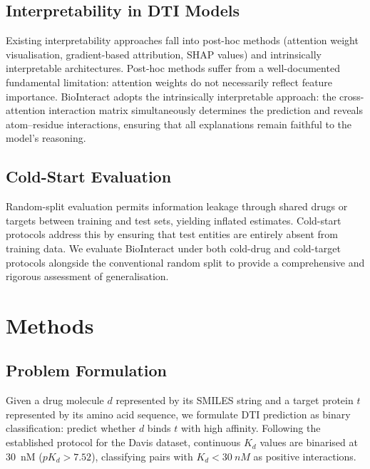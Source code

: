 \documentclass[fleqn,10pt]{wlscirep}
\begin{document}
\subsection{Interpretability in DTI Models}

Existing interpretability approaches fall into post-hoc methods (attention weight
visualisation, gradient-based attribution, SHAP
values\cite{jimenez2020drug}) and intrinsically interpretable architectures.
Post-hoc methods suffer from a well-documented fundamental limitation: attention
weights do not necessarily reflect feature importance.\cite{jain2019attention}
BioInteract adopts the intrinsically interpretable approach: the cross-attention
interaction matrix simultaneously determines the prediction and reveals
atom--residue interactions, ensuring that all explanations remain faithful to
the model's reasoning.

\subsection{Cold-Start Evaluation}

Random-split evaluation permits information leakage through shared drugs or
targets between training and test sets, yielding inflated
estimates.\cite{huang2021therapeutics}  Cold-start protocols address this by
ensuring that test entities are entirely absent from training data.  We evaluate
BioInteract under both cold-drug and cold-target protocols alongside the
conventional random split to provide a comprehensive and rigorous assessment of
generalisation.

\section{Methods}
\label{sec:methods}

\subsection{Problem Formulation}

Given a drug molecule $d$ represented by its SMILES string and a target protein
$t$ represented by its amino acid sequence, we formulate DTI prediction as
binary classification: predict whether $d$ binds $t$ with high affinity.
Following the established protocol for the Davis
dataset,\cite{davis2011comprehensive} continuous $K_d$ values are binarised
at \SI{30}{nM} ($pK_d > 7.52$), classifying pairs with $K_d < \SI{30}{nM}$ as
positive interactions.
\end{document}
